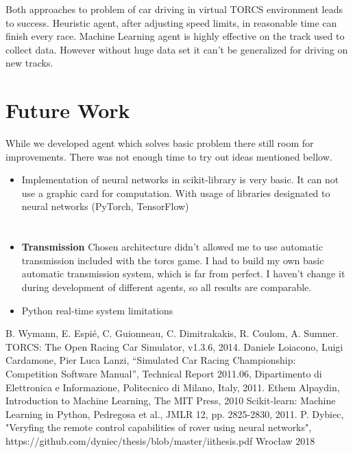 \documentclass[declaration,shortabstract,english,inz]{iithesis}
\begin{document}
Both approaches to problem of car driving in virtual TORCS environment leads to success.
Heuristic agent, after adjusting speed limits, in reasonable time can finish every race. Machine Learning agent is highly effective on the track used to collect data.
However without huge data set it can't be generalized for driving on new tracks. 

\section{Future Work}

While we developed agent which solves basic problem there still room for improvements. There was not enough time to try out ideas mentioned bellow.
\begin{itemize}
    \item Implementation of neural networks in scikit-library is very basic. It can not use a graphic card for computation. With usage of libraries designated to neural networks (PyTorch, TensorFlow)  
\end{itemize}



\section{}
\begin{itemize}
    \item \textbf{Transmission} Chosen architecture didn't allowed me to use automatic transmission included with the torcs game. I had to build my own basic automatic transmission system, which is far from perfect. I haven't change it during development of different agents, so all results are comparable. 
    \item Python real-time system limitations
\end{itemize}



\begin{thebibliography}{1}
 B. Wymann, E. Espié, C. Guionneau, C. Dimitrakakis, R. Coulom, A. Sumner. TORCS: The Open Racing Car Simulator, v1.3.6, 2014.
 Daniele Loiacono, Luigi Cardamone, Pier Luca Lanzi, “Simulated Car
Racing Championship: Competition Software Manual”, Technical Report 2011.06, Dipartimento
di Elettronica e Informazione, Politecnico di Milano, Italy, 2011.
 Ethem Alpaydin, Introduction to Machine Learning, The MIT Press, 2010
 Scikit-learn: Machine Learning in Python, Pedregosa et al., JMLR 12, pp. 2825-2830, 2011.
 P. Dybiec, "Veryfing the remote control capabilities of rover using neural networks", https://github.com/dyniec/thesis/blob/master/iithesis.pdf Wrocław 2018

\end{thebibliography}
\end{document}
